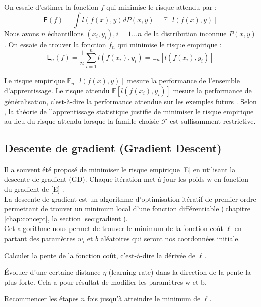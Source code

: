 	On essaie d'estimer la fonction $f$ qui minimise le risque attendu  \cite{bottou2010large} par :
	$$
	 \mathsf{E}(f) = \int l(f(x),y)dP(x,y) = \mathbb{E}[l(f(x),y)]
	$$
	Nous avons $n$ échantillons $(x_i, y_i), i = 1...n$ de la distribution inconnue $P(x, y)$. On essaie de trouver la fonction $f_n$ qui minimise le risque empirique \cite{bottou2010large} :
	\begin{equation}
		\mathsf{E}_n(f) = \frac{1}{n} \sum_{i=1}^{n} l(f(x_i),y_i) = \mathbb{E}_n[l(f(x_i),y_i)]
	\end{equation}
	
	Le risque empirique $\mathbb{E}_n[l(f(x),y)]$ mesure la performance de l'ensemble d'apprentissage. Le risque attendu $\mathbb{E}[l(f(x_i),y_i)]$ mesure la performance de généralisation, c'est-à-dire la performance attendue sur les exemples futurs \cite{bottou2012stochastic, ernst2014stochastic}. Selon \cite{bottou2012stochastic}, la théorie de l'apprentissage statistique justifie de minimiser le risque empirique au lieu du risque attendu lorsque la famille choisie $\mathcal{F}$ est suffisamment restrictive.
	
	
	\subsection{Descente de gradient (Gradient Descent)} \label{sec:gradient_descent}
	
	Il a souvent été proposé de minimiser le risque empirique [E] en utilisant la descente de gradient (GD). Chaque itération met à jour les poids w en fonction du gradient de [E] \cite{bottou2012stochastic}.\\
	La descente de gradient est un algorithme d'optimisation itératif de premier ordre permettant de trouver un minimum local d'une fonction différentiable (\cf$ \ $chapitre \ref{chap:concept}, la section \ref{sec:gradient}).\\
	Cet algorithme nous permet de trouver le minimum de la fonction coût $\ell$  en partant des paramètres $w_i$ et $b$ aléatoires qui seront nos coordonnées initiale.
	\begin{list}{--}{}
		\item Calculer la pente de la fonction coût, c’est-à-dire la dérivée de $\ell$.
		\item Évoluer d’une certaine distance $\eta$ (learning rate) dans la direction de la pente la plus forte. Cela a pour résultat de modifier les paramètres w et b.
		\item Recommencer les étapes $n$ fois jusqu’à atteindre le minimum de $\ell$.
	\end{list}
	
